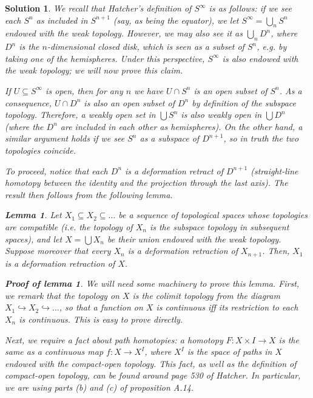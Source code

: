 \documentclass{article}
\theoremstyle{plain}
\newtheorem{lemma}{Lemma}
\theoremstyle{nonumberplain}
\newtheorem{sol}{Solution}
\newtheorem{lemmaproof}{Proof of lemma}
\begin{document}
\begin{sol}
We recall that Hatcher's definition of $S^\infty$ is as follows: if we see each $S^n$ as included in $S^{n+1}$ (say, as being the equator), we let $S^\infty = \bigcup_n S^n$ endowed with the weak topology. However, we may also see it as $\bigcup_n D^n$, where $D^n$ is the $n$-dimensional closed disk, which is seen as a subset of $S^n$, e.g. by taking one of the hemispheres. Under this perspective, $S^\infty$ is also endowed with the weak topology; we will now prove this claim.

If $U \subseteq S^\infty$ is open, then for any $n$ we have $U \cap S^n$ is an open subset of $S^n$. As a consequence, $U \cap D^n$ is also an open subset of $D^n$ by definition of the subspace topology. Therefore, a weakly open set in $\bigcup S^n$ is also weakly open in $\bigcup D^n$ (where the $D^n$ are included in each other as hemispheres). On the other hand, a similar argument holds if we see $S^n$ as a subspace of $D^{n+1}$, so in truth the two topologies coincide.

To proceed, notice that each $D^n$ is a deformation retract of $D^{n+1}$ (straight-line homotopy between the identity and the projection through the last axis). The result then follows from the following lemma.

\begin{lemma}
Let $X_1 \subseteq X_2 \subseteq \dots$ be a sequence of topological spaces whose topologies are compatible (i.e. the topology of $X_n$ is the subspace topology in subsequent spaces), and let $X = \bigcup X_n$ be their union endowed with the weak topology. Suppose moreover that every $X_n$ is a deformation retraction of $X_{n+1}$. Then, $X_1$ is a deformation retraction of $X$.
\end{lemma}

\begin{lemmaproof}
We will need some machinery to prove this lemma. First, we remark that the topology on $X$ is the colimit topology from the diagram $X_1 \hookrightarrow X_2 \hookrightarrow \dots$, so that a function on $X$ is continuous iff its restriction to each $X_n$ is continuous. This is easy to prove directly.

Next, we require a fact about path homotopies: a homotopy $F \colon X \times I \to X$ is the same as a continuous map $f \colon X \to X^I$, where $X^I$ is the space of paths in $X$ endowed with the compact-open topology. This fact, as well as the definition of compact-open topology, can be found around page 530 of Hatcher. In particular, we are using parts (b) and (c) of proposition A.14.


\end{lemmaproof}
\end{sol}
\end{document}
